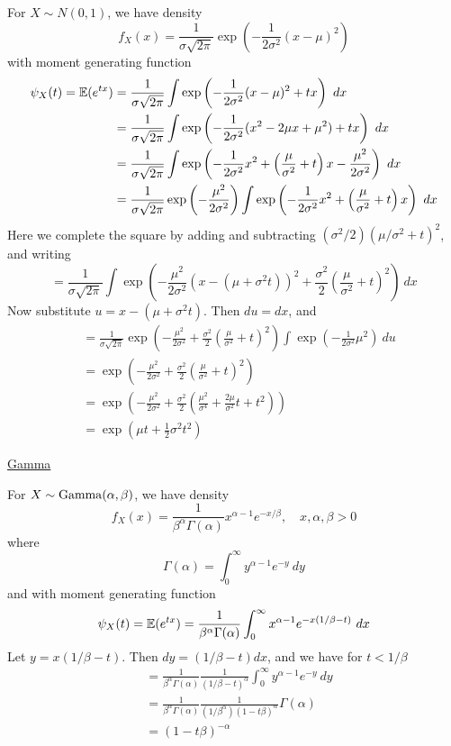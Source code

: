 \documentclass[a4paper]{article}
\begin{document}
For \(X \sim N(0,1)\), we have density
\[
	f_{X}(x) = \frac{1}{\sigma \sqrt{2 \pi }} \exp \left( -\frac{1}{2 \sigma^{2}} (x-\mu)^{2} \right) 
\]
with moment generating function
\begin{align*}
	\psi_{X}(t) = \mathbb{E}(e^{tx}) & = \frac{1}{\sigma \sqrt{2 \pi }} \int \exp \left( -\frac{1}{2 \sigma^{2}}(x-\mu)^{2} + tx \right) \ dx \\
	 & = \frac{1}{\sigma \sqrt{2 \pi }} \int \exp \left( -\frac{1}{2 \sigma^{2}} (x^{2} - 2 \mu x + \mu^{2}) + tx \right) \ dx \\ 
	 & = \frac{1}{\sigma \sqrt{2 \pi }} \int \exp \left( -\frac{1}{2 \sigma^{2}} x^{2} + \left( \frac{\mu }{\sigma^{2}} + t \right)x - \frac{\mu^{2}}{2 \sigma^{2}} \right) \ dx \\
	 & = \frac{1}{\sigma \sqrt{2 \pi }} \exp \left( -\frac{\mu^{2}}{2 \sigma^{2}} \right) \int \exp \left( -\frac{1}{2 \sigma^{2}}x^{2} + \left( \frac{\mu }{\sigma^{2}} + t \right) x \right)   \ dx 
\end{align*}
Here we complete the square by adding and subtracting \((\sigma^{2}/2)(\mu/\sigma^{2} + t)^{2}\), and writing
\[
	= \frac{1}{\sigma \sqrt{2 \pi }} \int \exp \left( -\frac{\mu^{2}}{2 \sigma^{2}} ( x - (\mu + \sigma^{2} t))^{2} + \frac{\sigma^{2}}{2} \left( \frac{\mu }{\sigma^{2}} + t \right)^{2} \right) \ dx
\]
Now substitute \(u = x - (\mu + \sigma^{2}t)\). Then \(du = dx\), and
\begin{align*}
	 & = \frac{1}{\sigma \sqrt{2 \pi }} \exp \left( -\frac{\mu^{2}}{2 \sigma^{2}} + \frac{\sigma^{2}}{2} \left( \frac{\mu }{\sigma^{2}} + t \right)^{2} \right) \int \exp \left( -\frac{1}{2 \sigma^{2}} \mu^{2} \right) \ du \\
	 & = \exp \left( -\frac{\mu^{2}}{2 \sigma^{2}} + \frac{\sigma^{2}}{2} \left( \frac{\mu }{\sigma^{2}} + t \right)^{2} \right)  \\ 
	 & = \exp \left( -\frac{\mu^{2}}{2 \sigma^{2}} + \frac{\sigma^{2}}{2} \left( \frac{\mu^{2}}{\sigma^{4}} + \frac{2 \mu }{\sigma^{2}} t + t^{2} \right)  \right) \\
	 &= \boxed{\exp \left( \mu t + \frac{1}{2} \sigma^{2} t^{2} \right) }
\end{align*}

\underline{Gamma }

For \(X \sim \operatorname{Gamma}(\alpha ,\beta )\), we have density
\[
	f_{X}(x) = \frac{1}{\beta^{\alpha } \Gamma(\alpha )} x^{\alpha -1} e^{-x/\beta }, \quad x, \alpha, \beta > 0
\]
where
\[
	\Gamma(\alpha ) = \int^{\infty}_{0} y^{\alpha -1} e^{-y} \ dy 
\]
and with moment generating function
\[
	\psi_{X}(t) = \E(e^{tx}) = \frac{1}{\beta^{\alpha } \Gamma(\alpha )} \int^{\infty}_{0} x^{\alpha -1} e^{-x(1/\beta - t)} \ dx 
\]
Let \(y = x (1/\beta -t)\). Then \(dy = (1/\beta -t)dx\), and we have for \(t < 1/\beta \)
\begin{align*}
	 & = \frac{1}{\beta^{\alpha } \Gamma(\alpha )} \frac{1}{(1/\beta - t)^{\alpha }} \int^{\infty}_{0} y^{\alpha -1} e^{-y} \ dy  \\
	 & = \frac{1}{\beta^{\alpha } \Gamma(\alpha )} \frac{1}{(1/\beta^{\alpha }) (1-t \beta )^{\alpha }}\Gamma(\alpha ) \\ 
	 & = \boxed{(1 - t \beta )^{-\alpha }}
\end{align*}
\end{document}

